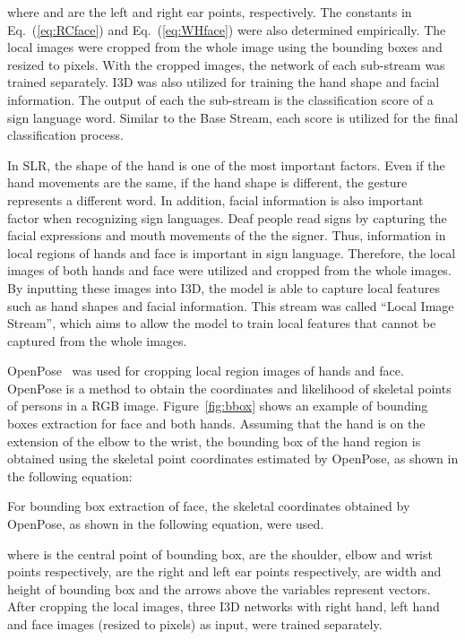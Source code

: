 \documentclass[journal]{IEEEtran}
\begin{document}
where  and  are the left and right ear points, respectively. The constants in Eq.~(\ref{eq:RCface}) and Eq.~(\ref{eq:WHface}) were also determined empirically. 
The local images were cropped from the whole image using the bounding boxes and resized to  pixels. With the cropped images, the network of each sub-stream was trained separately. I3D was also utilized for training the hand shape and facial information. The output of each the sub-stream is the classification score of a sign language word. Similar to the Base Stream, each score is utilized for the final classification process. 

In SLR, the shape of the hand is one of the most important factors.
Even if the hand movements are the same, if the hand shape is different, the gesture represents a different word.
In addition, facial information is also important factor when recognizing sign languages.
Deaf people read signs by capturing the facial expressions and mouth movements of the the signer.
Thus, information in local regions of hands and face is important in sign language.
Therefore, the local images of both hands and face were utilized and cropped from the whole images.
By inputting these images into I3D, the model is able to capture local features such as hand shapes and facial information.
This stream was called ``Local Image Stream'', which aims to allow the model to train local features that cannot be captured from the whole images.

OpenPose~\cite{cao2017openpose} was used for cropping local region images of hands and face. OpenPose is a method to obtain the coordinates and likelihood of skeletal points of persons in a RGB image. Figure~\ref{fig:bbox} shows an example of bounding boxes extraction for face and both hands. Assuming that the hand is on the extension of the elbow to the wrist, the bounding box of the hand region is obtained using the skeletal point coordinates estimated by OpenPose, as shown in the following equation:

For bounding box extraction of face, the skeletal coordinates obtained by OpenPose, as shown in the following equation, were used.

where  is the central point of bounding box,  are the shoulder, elbow and wrist points respectively,  are the right and left ear points respectively,  are width and height of bounding box and the arrows above the variables represent vectors. After cropping the local images, three I3D networks with right hand, left hand and face images (resized to  pixels) as input, were trained separately.
\fi
\end{document}
